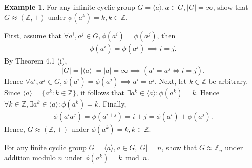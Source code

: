 \documentclass{article}
\theoremstyle{definition}
\newtheorem{example}{Example}[section]
\begin{document}
 \begin{example}
    For any infinite cyclic group $G=\langle a \rangle, a \in G, |G| = \infty$, show that $G \approx (\mathbb{Z},+)$ under $\phi(a^k) = k, k \in \mathbb{Z}$. 
    
    First, assume that $\forall a^i, a^j \in G, \phi(a^i) = \phi(a^j)$, then
    \begin{align*}
        \phi(a^i) = \phi(a^j) \implies i = j.
    \end{align*}
    By Theorem 4.1 (i),
    \begin{equation*}
        |G| = |\langle a \rangle| = |a| = \infty \implies (a^i = a^j \iff i = j).
    \end{equation*}
    Hence $\forall a^i, a^j \in G, \phi(a^i) = \phi(a^j) \implies a^i = a^j$. Next, let $k \in \mathbb{Z}$ be arbitrary. Since $\langle a \rangle = \{a^k: k \in \mathbb{Z}\}$, it follows that $\exists a^k \in \langle a \rangle: \phi(a^k) = k$. Hence $\forall k \in \mathbb{Z}, \exists a^k \in \langle a \rangle: \phi(a^k) = k$. Finally, 
    \begin{align*}
        \phi(a^ia^j) = \phi(a^{i+j}) = i+j = \phi(a^i)+\phi(a^j).
    \end{align*}
    Hence, $G \approx (\mathbb{Z},+)$ under $\phi(a^k) = k, k \in \mathbb{Z}$.
    
    For any finite cyclic group $G = \langle a \rangle, a \in G, |G| = n$, show that $G \approx \mathbb{Z}_n$ under addition modulo $n$ under $\phi(a^k) = k \bmod n$.
    

\end{example}
\end{document}
